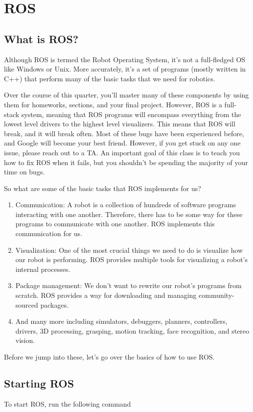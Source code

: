 \section{ROS}
\subsection{What is ROS?}
Although ROS is termed the Robot Operating System, it's not a full-fledged OS like Windows or Unix. More accurately, it's a set of programs (mostly written in C++) that perform many of the basic tasks that we need for robotics. 

Over the course of this quarter, you'll master many of these components by using them for homeworks, sections, and your final project. However, ROS is a full-stack system, meaning that ROS programs will encompass everything from the lowest level drivers to the highest level visualizers. This means that ROS will break, and it will break often. Most of these bugs have been experienced before, and Google will become your best friend. However, if you get stuck on any one issue, please reach out to a TA. An important goal of this class is to teach you how to fix ROS when it fails, but you shouldn't be spending the majority of your time on bugs. 

So what are some of the basic tasks that ROS implements for us?
\begin{enumerate}
\item Communication: A robot is a collection of hundreds of software programs interacting with one another. Therefore, there has to be some way for these programs to communicate with one another. ROS implements this communication for us.
\item Visualization: One of the most crucial things we need to do is visualize how our robot is performing. ROS provides multiple tools for visualizing a robot's internal processes.
\item Package management: We don't want to rewrite our robot's programs from scratch. ROS provides a way for downloading and managing community-sourced packages.
\item And many more including simulators, debuggers, planners, controllers, drivers, 3D processing, grasping, motion tracking, face recognition, and stereo vision.
\end{enumerate}

Before we jump into these, let's go over the basics of how to use ROS.
\subsection{Starting ROS}
To start ROS, run the following command 

